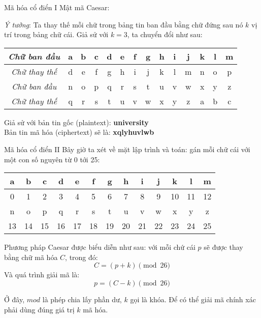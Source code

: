 \begin{frame}{Mã hóa cổ điển I}
Mật mã Caesar:

\textit{Ý tưởng}: Ta thay thế mỗi chữ trong bảng tin ban đầu bằng chữ đứng sau nó $k$ vị trí trong bảng chữ cái. Giả sử với $k=3$, ta chuyển đổi như sau:

\begin{table}
\begin{tabular}{| c | c | c | c | c | c | c | c | c | c | c | c | c | c |}
\hline
\textit{Chữ ban đầu} & a & b & c & d & e & f & g & h & i & j & k & l & m \\
\hline
\textit{Chữ thay thế} & d & e & f & g & h & i & j & k & l & m & n & o & p \\
\hline \hline
\textit{Chữ ban đầu} & n & o & p & q & r & s & t & u & v & w & x & y & z \\ \hline
\textit{Chữ thay thế} & q & r & s & t & u & v & w & x & y & z & a & b & c \\ \hline
\end{tabular}
\end{table}

Giả sử với bản tin gốc (plaintext): \textbf{university} \\ Bản tin mã hóa (ciphertext) sẽ là: \textbf{xqlyhuvlwb}
\end{frame}

\begin{frame}{Mã hóa cổ điển II}
Bây giờ ta xét về mặt lập trình và toán: gán mỗi chữ cái với một con số nguyên từ 0 tới 25:

\begin{table}
\begin{tabular}{| c | c | c | c | c | c | c | c | c | c | c | c | c |}
\hline
a & b & c & d & e & f & g & h & i & j & k & l & m \\ \hline 0 & 1 & 2 & 3 & 4 & 5 & 6 & 7 & 8 & 9 & 10 & 11 & 12 \\
\hline \hline
n & o & p & q & r & s & t & u & v & w & x & y & z \\ \hline 13 & 14 & 15 & 16 & 17 & 18 & 19 & 20 & 21 & 22 & 23 & 24 & 25 \\ \hline
\end{tabular}
\end{table}

Phương pháp Caesar được biểu diễn như sau: với mỗi chứ cái $p$ sẽ được thay bằng chữ mã hóa $C$, trong đó: \[C = (p+k) \pmod{26}\]
Và quá trình giải mã là: \[p = (C-k) \pmod{26}\]

Ở đây, $mod$ là phép chia lấy phần dư, $k$ gọi là khóa. Để có thể giải mã chính xác phải dùng đúng giá trị $k$ mã hóa.
\end{frame}

